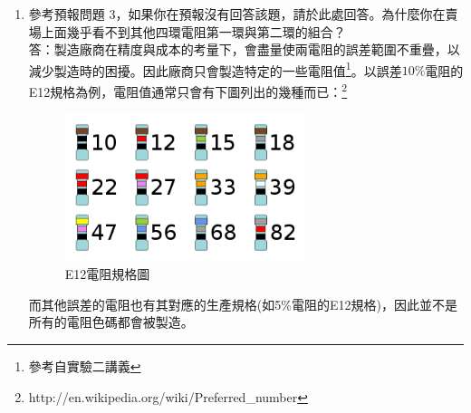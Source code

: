 \documentclass[12pt, a4paper]{article}
\def\large{\fontsize{14}{21}\selectfont}
\begin{document}
\begin{enumerate}[itemsep=20pt, topsep=10pt]
\begin{enumerate}[label=(\alph*)]
		\item {\large 參考預報問題 3，如果你在預報沒有回答該題，請於此處回答。為什麼你在賣場上面幾乎看不到其他四環電阻第一環與第二環的組合？}\\[5pt]
			答：製造廠商在精度與成本的考量下，會盡量使兩電阻的誤差範圍不重疊，以減少製造時的困擾。因此廠商只會製造特定的一些電阻值\footnote{參考自實驗二講義}。以誤差$10 \%$電阻的E12規格為例，電阻值通常只會有下圖列出的幾種而已：\footnote{http://en.wikipedia.org/wiki/Preferred\_number}
				\begin{figure}[H]
					\begin{center}
						\includegraphics[width=7cm]{fig1.png}
						\caption{E12電阻規格圖}
						\label{fig:fig1}
					\end{center}
				\end{figure}
				而其他誤差的電阻也有其對應的生產規格(如5\%電阻的E12規格)，因此並不是所有的電阻色碼都會被製造。	
	\end{enumerate}
\end{enumerate}
\end{document}
